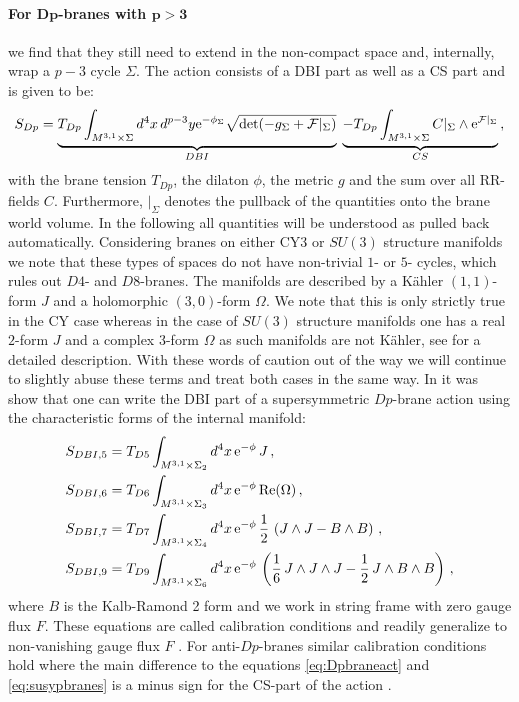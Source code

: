 \documentclass[a4paper,12pt,twoside,openright]{report}
\newcommand{\be}{\begin{equation}}
\newcommand{\ee}{\end{equation}}
\newcommand{\bea}{\begin{equation}\begin{aligned}}
\newcommand{\eea}{\end{aligned}\end{equation}}
\def\rme{{\rm e}}
\def\rmre{{\rm Re}}
\begin{document}
\paragraph{For $\mathbf{Dp}$-branes with $\mathbf{p>3}$} we find that they still need to extend in the non-compact space and, internally, wrap a $p-3$ cycle $\Sigma$. The action consists of a DBI part as well as a CS part and is given to be:
\be 
S_{Dp} = \underbrace{T_{Dp} \int_{M^{3,1}\times \Sigma} d^4x \,d^{p-3}y \rme^{-\phi_\Sigma}\sqrt{\det (-g_\Sigma + \mathcal{F}|_\Sigma)}}_{DBI} \;\underbrace{- T_{Dp} \int_{M^{3,1}\times \Sigma} C|_\Sigma \wedge \rme^{\mathcal{F}|_\Sigma}}_{CS}\,,
\label{eq:Dpbraneact}
\ee
with the brane tension $T_{Dp}$, the dilaton $\phi$, the metric $g$ and the sum over all RR-fields $C$. Furthermore, $|_\Sigma$ denotes the pullback of the quantities onto the brane world volume. In the following all quantities will be understood as pulled back automatically. Considering branes on either CY3 or $SU(3)$ structure manifolds we note that these types of spaces do not have non-trivial $1$- or $5$- cycles, which rules out $D4$- and $D8$-branes. The manifolds are described by a Kähler $(1,1)$-form $J$ and a holomorphic $(3,0)$-form $\Omega$. We note that this is only strictly true in the CY case whereas in the case of $SU(3)$ structure manifolds one has a real $2$-form $J$ and a complex $3$-form $\Omega$ as such manifolds are not Kähler, see \cite{Grana:2005jc} for a detailed description. With these words of caution out of the way we will continue to slightly abuse these terms and treat both cases in the same way. In \cite{Blumenhagen:2006ci} it was show that one can write the DBI part of a supersymmetric $Dp$-brane action using the characteristic forms of the internal manifold:
\bea 
S_{DBI,5} &= T_{D5} \int_{M^{3,1}\times \Sigma_2} d^4x \, \rme^{-\phi} \,J\,,\\
S_{DBI,6} &= T_{D6} \int_{M^{3,1}\times \Sigma_3} d^4x \, \rme^{-\phi} \, \rmre(\Omega)\,,\\
S_{DBI,7} &= T_{D7} \int_{M^{3,1}\times \Sigma_4} d^4x \, \rme^{-\phi} \,\frac{1}{2}\,\left(J\wedge J-B\wedge B \right)\,,\\
S_{DBI,9} &= T_{D9} \int_{M^{3,1}\times \Sigma_6} d^4x \, \rme^{-\phi}\, \left(\frac{1}{6} \, J \wedge J \wedge J - \frac{1}{2}\,J \wedge B \wedge B \right)\,,
\label{eq:susypbranes}
\eea
where $B$ is the Kalb-Ramond 2 form and we work in string frame with zero gauge flux $F$. These equations are called calibration conditions and readily generalize to non-vanishing gauge flux $F$ \cite{Martucci:2005ht,Martucci:2006ij,Martucci:2011dn}. For anti-$Dp$-branes similar calibration conditions hold where the main difference to the equations \eqref{eq:Dpbraneact} and \eqref{eq:susypbranes} is a minus sign for the CS-part of the action \cite{Kallosh:2018nrk}.
\end{document}
